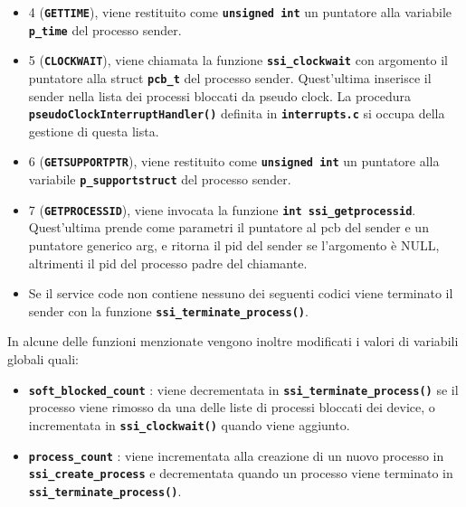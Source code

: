 \documentclass{article}
\begin{document}
\begin{itemize}
    \item 4 (\texttt{\textbf{GETTIME}}), viene restituito come \texttt{\textbf{unsigned int}} un puntatore alla variabile \texttt{\textbf{p\_time}} del processo sender.
	
    \item 5 (\texttt{\textbf{CLOCKWAIT}}), viene chiamata la funzione \texttt{\textbf{ssi\_clockwait}} con argomento il puntatore alla struct \texttt{\textbf{pcb\_t}} del processo sender.
    Quest'ultima inserisce il sender nella lista dei processi bloccati da pseudo clock.
    La procedura \texttt{\textbf{pseudoClockInterruptHandler()}} definita in \texttt{\textbf{interrupts.c}} si occupa della gestione di questa lista.

    \item 6 (\texttt{\textbf{GETSUPPORTPTR}}), viene restituito come \texttt{\textbf{unsigned int}} un puntatore alla variabile \texttt{\textbf{p\_supportstruct}} del processo sender.

    \item 7 (\texttt{\textbf{GETPROCESSID}}), viene invocata la funzione \texttt{\textbf{int ssi\_getprocessid}}. Quest'ultima prende come parametri il puntatore al pcb del sender e un puntatore generico arg, e ritorna il pid del sender se l'argomento è NULL, altrimenti il pid del processo padre del chiamante.

    \item Se il service code non contiene nessuno dei seguenti codici viene terminato il sender con la funzione \texttt{\textbf{ssi\_terminate\_process()}}.
\end{itemize} 

In alcune delle funzioni menzionate vengono inoltre modificati i valori di variabili globali quali:
\begin{itemize}
	\item \texttt{\textbf{soft\_blocked\_count}}  : viene decrementata in \texttt{\textbf{ssi\_terminate\_process()}} se il processo viene rimosso da una delle liste di processi bloccati dei device, o incrementata in \texttt{\textbf{ssi\_clockwait()}} quando viene aggiunto.
	\item \texttt{\textbf{process\_count}} : viene incrementata alla creazione di un nuovo processo in \texttt{\textbf{ssi\_create\_process}} e decrementata quando un processo viene terminato in \texttt{\textbf{ssi\_terminate\_process()}}. 
\end{itemize}


\newpage
\end{document}
